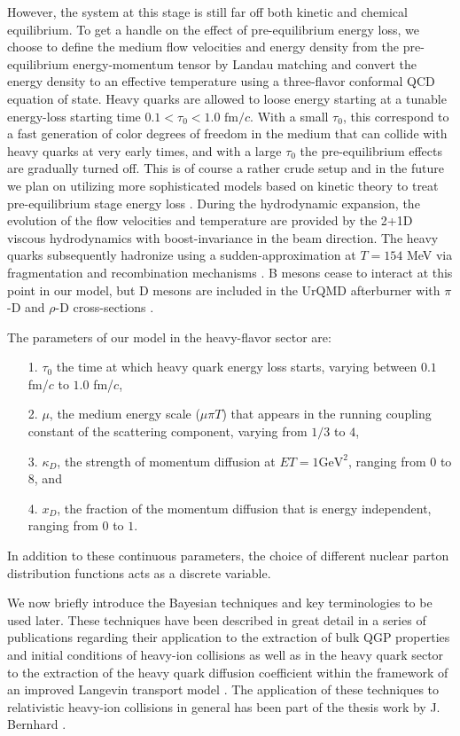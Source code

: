 \documentclass[aps, prc, reprint, amsmath, groupedaddress, nofootinbib]{revtex4-1}
\begin{document}
However, the system at this stage is still far off both kinetic and chemical equilibrium.
To get a handle on the effect of pre-equilibrium energy loss, we choose to define the medium flow velocities and energy density from the pre-equilibrium energy-momentum tensor by Landau matching and convert the energy density to an effective temperature using a three-flavor conformal QCD equation of state. 
Heavy quarks are allowed to loose energy starting at a tunable energy-loss starting time $0.1< \tau_0 < 1.0 \textrm{ fm/$c$} $. 
With a small $\tau_0$, this correspond to a fast generation of color degrees of freedom in the medium that can collide with heavy quarks at very early times, and with a large $\tau_0$ the pre-equilibrium effects are gradually turned off.
This is of course a rather crude setup and in the future we plan on utilizing more sophisticated models based on kinetic theory to treat pre-equilibrium stage energy loss \cite{Srivastava:2017bcm}.
During the hydrodynamic expansion, the evolution of the flow velocities and temperature are provided by the 2+1D viscous hydrodynamics with boost-invariance in the beam direction.
The heavy quarks subsequently hadronize using a sudden-approximation at $T = 154$ MeV via fragmentation and recombination mechanisms \cite{Cao:2013ita}. 
B mesons cease to interact at this point in our model, but D mesons are included in the UrQMD afterburner with $\pi$-D and $\rho$-D cross-sections \cite{Lin:2000jp}.

The parameters of our model in the heavy-flavor sector are:
\begin{itemize}
\item[1.] $\tau_0$ the time at which heavy quark energy loss starts, varying between $0.1$ fm/$c$ to $1.0$ fm/$c$,
\item[2.] $\mu$, the medium energy scale ($\mu\pi T$) that appears in the running coupling constant of the scattering component, varying from $1/3$ to $4$,
\item[3.] $\kappa_D$, the strength of momentum diffusion at $ET = 1 \textrm{GeV}^2$, ranging from $0$ to $8$, and
\item[4.] $x_D$, the fraction of the momentum diffusion that is energy independent, ranging from $0$ to $1$.
\end{itemize}
In addition to these continuous parameters, the choice of different nuclear parton distribution functions acts as a discrete variable.

We now briefly introduce the Bayesian techniques and key terminologies to be used later. These techniques have been described in great detail in a series of publications regarding their application to the extraction of bulk QGP properties and initial conditions of heavy-ion collisions \cite{Bernhard:2015hxa,Bernhard:2016tnd} as well as in the heavy quark sector to the extraction of the heavy quark diffusion coefficient within the framework of an improved Langevin transport model \cite{Xu:2017obm}.
The application of these techniques to relativistic heavy-ion collisions in general has been part of the 
thesis work by J. Bernhard \cite{Bernhard:2018hnz}.
\end{document}
